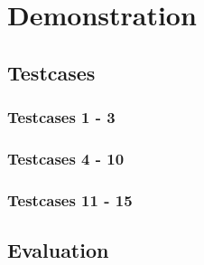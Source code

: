 \chapter{Demonstration}

\section{Testcases}

\subsection{Testcases 1 - 3}

\subsection{Testcases 4 - 10}

\subsection{Testcases 11 - 15}

\section{Evaluation}